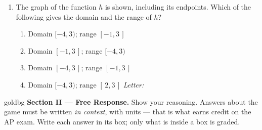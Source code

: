 \documentclass[10pt]{article}
\begin{document}
\begin{enumerate}[leftmargin=1.9em, itemsep=11pt]
\item \begin{minipage}[t]{0.58\linewidth}
      The graph of the function $h$ is shown, including its endpoints. Which of the following
      gives the domain and the range of $h$?
      \begin{enumerate}[leftmargin=2.6em, itemsep=3pt]
        \item[{\color{keyred}$\checkmark$\,(A)}] Domain $[-4, 3)$; range $[-1, 3\,]$
        \item[(B)] Domain $[-1, 3\,]$; range $[-4, 3)$
        \item[(C)] Domain $[-4, 3\,]$; range $[-1, 3\,]$
        \item[(D)] Domain $[-4, 3)$; range $[\,2, 3\,]$ \hfill\textit{Letter:}~\gradedblank[id=ap5, type=choice, points=1, answer=A]{0.42in}{13pt}
      \end{enumerate}
      \end{minipage}\hfill
      \begin{minipage}[t]{0.36\linewidth}
      \vspace{-4pt}
      \centering
      \end{minipage}

\end{enumerate}

\newpage

\begin{headlinebox}{goldbg}
\small
\textbf{Section II --- Free Response.} Show your reasoning. Answers about the game must be
written \emph{in context}, with units --- that is what earns credit on the AP exam. Write each answer in its box; only what is inside a box is graded.
\end{headlinebox}

\vspace{0.08in}
\end{document}
